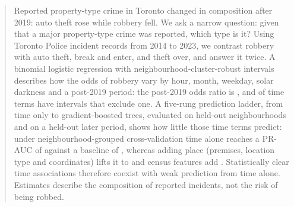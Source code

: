 \begin{abstract}\noindent\small
Reported property-type crime in Toronto changed in composition after 2019: auto theft rose while robbery fell.
We ask a narrow question: given that a major property-type crime was reported, which type is it?
Using  Toronto Police incident records from 2014 to 2023, we contrast robbery with auto theft, break and enter, and theft over, and answer it twice.
A binomial logistic regression with neighbourhood-cluster-robust intervals describes how the odds of robbery vary by hour, month, weekday, solar darkness and a post-2019 period: the post-2019 odds ratio is  , and  of  time terms have intervals that exclude one.
A five-rung prediction ladder, from time only to gradient-boosted trees, evaluated on held-out neighbourhoods and on a held-out later period, shows how little those time terms predict: under neighbourhood-grouped cross-validation time alone reaches a PR-AUC of   against a baseline of , whereas adding place (premises, location type and coordinates) lifts it to   and census features add  .
Statistically clear time associations therefore coexist with weak prediction from time alone.
Estimates describe the composition of reported incidents, not the risk of being robbed.
\end{abstract}
